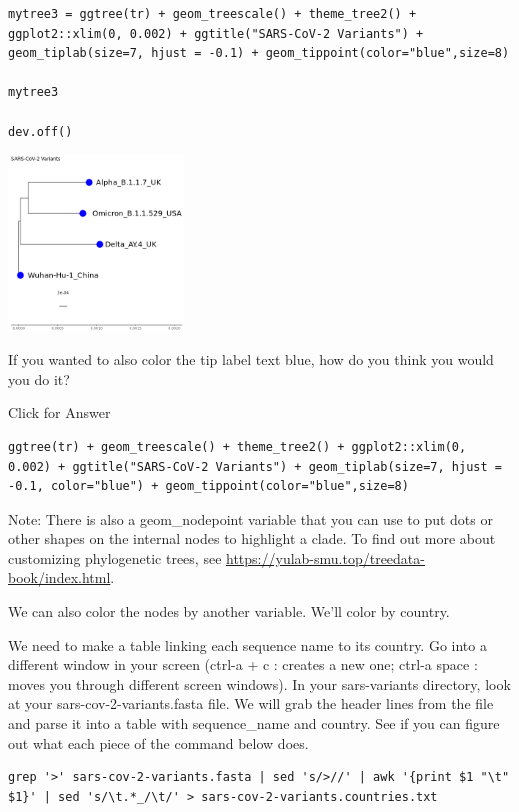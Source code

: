 \documentclass[
]{book}
\begin{document}
\begin{verbatim}
mytree3 = ggtree(tr) + geom_treescale() + theme_tree2() + ggplot2::xlim(0, 0.002) + ggtitle("SARS-CoV-2 Variants") + geom_tiplab(size=7, hjust = -0.1) + geom_tippoint(color="blue",size=8)

mytree3

dev.off()
\end{verbatim}

\includegraphics[width=0.35\textwidth,height=\textheight]{./Figures/tip.tree.png}

If you wanted to also color the tip label text blue, how do you think you would you do it?

Click for Answer

\begin{verbatim}
ggtree(tr) + geom_treescale() + theme_tree2() + ggplot2::xlim(0, 0.002) + ggtitle("SARS-CoV-2 Variants") + geom_tiplab(size=7, hjust = -0.1, color="blue") + geom_tippoint(color="blue",size=8)
\end{verbatim}

\hfill\break

Note: There is also a geom\_nodepoint variable that you can use to put dots or other shapes on the internal nodes to highlight a clade. To find out more about customizing phylogenetic trees, see \url{https://yulab-smu.top/treedata-book/index.html}.

We can also color the nodes by another variable. We'll color by country.

We need to make a table linking each sequence name to its country. Go into a different window in your screen (ctrl-a + c : creates a new one; ctrl-a space : moves you through different screen windows). In your sars-variants directory, look at your sars-cov-2-variants.fasta file. We will grab the header lines from the file and parse it into a table with sequence\_name and country. See if you can figure out what each piece of the command below does.

\begin{verbatim}
grep '>' sars-cov-2-variants.fasta | sed 's/>//' | awk '{print $1 "\t" $1}' | sed 's/\t.*_/\t/' > sars-cov-2-variants.countries.txt
\end{verbatim}
\end{document}
